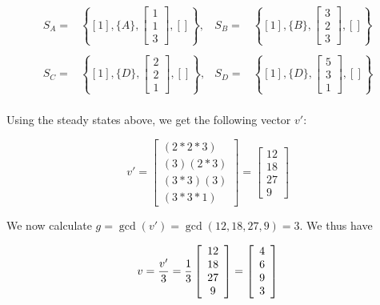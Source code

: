 \begin{displaymath}
\begin{array}{lrlr}
S_A = & \left\{[1], \{A\}, { \left[
\begin{array}{c} 1 \\ 1 \\ 3
\end{array}
\right]}, [] \right\}, &

S_B = & \left\{[1], \{B\}, { \left[
\begin{array}{c} 3 \\ 2 \\ 3
\end{array}
\right]}, [] \right\} \\ \\

S_C = & \left\{[1], \{D\}, { \left[
\begin{array}{c} 2 \\ 2 \\ 1
\end{array}
\right]}, [] \right\}, &

S_D = & \left\{[1], \{D\}, { \left[
\begin{array}{c} 5 \\ 3 \\ 1
\end{array}
\right]}, [] \right\} \\

\end{array}
\end{displaymath}

Using the steady states above, we get the following vector $v'$:

\begin{displaymath}
v' = \left[
\begin{array}{c}
(2 * 2 * 3)\\
(3) (2 * 3) \\
(3 * 3) (3) \\
(3 * 3 * 1)
\end{array}
\right] = \left[
\begin{array}{c}
12\\ 18\\ 27\\ 9
\end{array}
\right]
\end{displaymath}

We now calculate $g = \gcd(v') = \gcd(12,18,27,9) = 3$.  We thus
have

\begin{displaymath}
v = {v' \over 3} = {1 \over 3} \left[
\begin{array}{c}
12\\ 18\\ 27\\ 9
\end{array}
\right] = \left[
\begin{array}{c}
4\\ 6\\ 9\\ 3
\end{array}
\right]
\end{displaymath}

